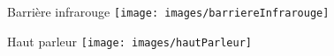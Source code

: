 \begin{UPSTIactivite}
\begin{minipage}[b]{0.24\textwidth}

\end{minipage}
\begin{minipage}[b]{0.24\textwidth}
\centering
  Barrière infrarouge
  \texttt{[image: images/barriereInfrarouge]}


\end{minipage}
\begin{minipage}[b]{0.24\textwidth}
\centering
  Haut parleur
  \texttt{[image: images/hautParleur]}


\end{minipage}





\end{UPSTIactivite}
